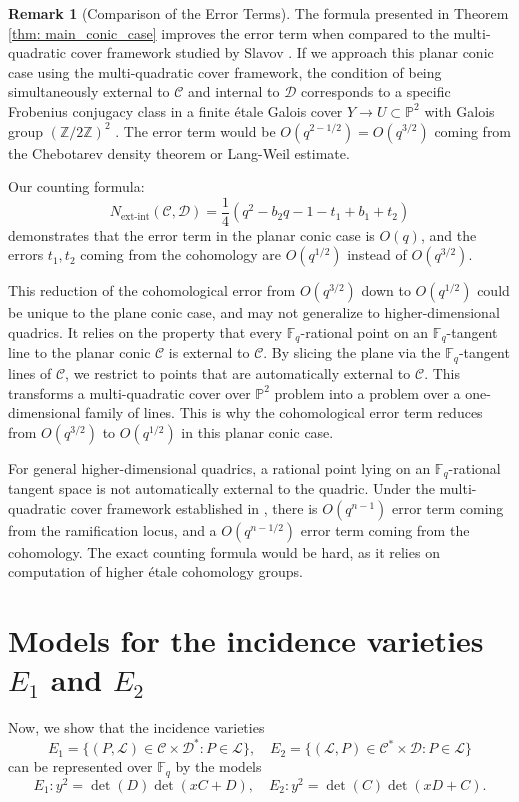\documentclass[11pt]{article}
\theoremstyle{definition}
\newtheorem*{rmk}{Remark}
\theoremstyle{definition}
\begin{document}
\begin{rmk}[Comparison of the Error Terms]
The formula presented in Theorem \ref{thm: main_conic_case} improves the error term when compared to the multi-quadratic cover framework studied by Slavov \cite{Slavov}. If we approach this planar conic case using the multi-quadratic cover framework, the condition of being simultaneously external to $\mathcal{C}$ and internal to $\mathcal{D}$ corresponds to a specific Frobenius conjugacy class in a finite étale Galois cover $Y \to U \subset \mathbb{P}^2$ with Galois group $(\mathbb{Z}/2\mathbb{Z})^2$ \cite{Slavov, Mypaper}. The error term would be $O(q^{2-1/2}) = O(q^{3/2})$ coming from the Chebotarev density theorem or Lang-Weil estimate.

Our counting formula:
\[
N_{\mathrm{ext\text{-}int}}(\mathcal{C}, \mathcal{D}) = \frac{1}{4}\left(q^2 - b_2 q - 1 - t_1 + b_1 + t_2\right)
\]
demonstrates that the error term in the planar conic case is $O(q)$, and the errors $t_1, t_2$ coming from the cohomology are $O(q^{1/2})$ instead of $O(q^{3/2})$.

This reduction of the cohomological error from $O(q^{3/2})$ down to $O(q^{1/2})$ could be unique to the plane conic case, and may not generalize to higher-dimensional quadrics. It relies on the property that every $\mathbb{F}_q$-rational point on an $\mathbb{F}_q$-tangent line to the planar conic $\mathcal{C}$ is external to $\mathcal{C}$. By slicing the plane via the $\mathbb{F}_q$-tangent lines of $\mathcal{C}$, we restrict to points that are automatically external to $\mathcal{C}$. This transforms a multi-quadratic cover over $\mathbb{P}^2$ problem into a problem over a one-dimensional family of lines. This is why the cohomological error term reduces from $O(q^{3/2})$ to $O(q^{1/2})$ in this planar conic case.

For general higher-dimensional quadrics, a rational point lying on an $\mathbb{F}_q$-rational tangent space is not automatically external to the quadric. Under the multi-quadratic cover framework established in \cite{Slavov, Mypaper}, there is $O(q^{n-1})$ error term coming from the ramification locus, and a $O(q^{n-1/2})$ error term coming from the cohomology. The exact counting formula would be hard, as it relies on computation of higher étale cohomology groups.
\end{rmk}

\section*{Models for the incidence varieties \(E_1\) and \(E_2\)}
Now, we show that the incidence varieties 
$$E_1 = \{(P, \mathcal L)\in \mathcal C\times\mathcal D^* : P\in \mathcal L\}, \quad E_2 = \{(\mathcal L, P)\in\mathcal{C}^*\times\mathcal{D}: P\in\mathcal{L}\}$$
can be represented over $\mathbb F_q$ by the models 
$$ E_1: y^2 = \det(D)\det(xC+D), \quad 
    E_2: y^2 = \det(C)\det(xD+C). $$
\end{document}
